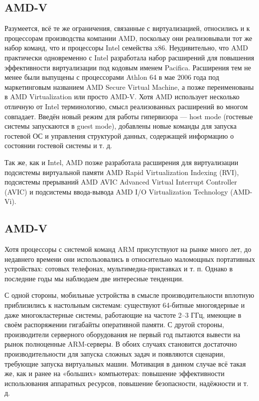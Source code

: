 \documentclass[14pt, a4paper]{article}
\begin{document}
\subsection*{\textbf{AMD-V}}

Разумеется, всё те же ограничения, связанные с виртуализацией, относились и к процессорам
производства компании AMD, поскольку они реализовывали тот же набор команд, что и процессоры
Intel семейства x86. Неудивительно, что AMD практически одновременно с Intel разработала набор
расширений для повышения эффективности виртуализации под кодовым именем Pacifica.
Расширения тем не менее были выпущены с процессорами Athlon 64 в мае 2006 года под
маркетинговым названием AMD Secure Virtual Machine, а позже переименованы в AMD Virtualization
или просто AMD-V. Хотя AMD использует несколько отличную от Intel терминологию, смысл
реализованных расширений во многом совпадает. Введён новый режим для работы гипервизора —
host mode (гостевые системы запускаются в guest mode), добавлены новые команды для запуска
гостевой ОС и управления структурой данных, содержащей информацию о состоянии гостевой
системы и т. д.

Так же, как и Intel, AMD позже разработала расширения для виртуализации подсистемы виртуальной
памяти AMD Rapid Virtualization Indexing (RVI), подсистемы прерываний AMD AVIC Advanced Virtual
Interrupt Controller (AVIC) и подсистемы ввода-вывода AMD I/O Virtualization Technology (AMD-Vi).

\subsection*{\textbf{AMD-V}}

Хотя процессоры с системой команд ARM присутствуют на рынке много лет, до недавнего времени
они использовались в относительно маломощных портативных устройствах: сотовых телефонах,
мультимедиа-приставках и т. п. Однако в последние годы мы наблюдаем две интересные тенденции.

С одной стороны, мобильные устройства в смысле производительности вплотную приблизились к
настольным системам: существуют 64-битные многоядерные и даже многокластерные системы,
работающие на частоте 2–3 ГГц, имеющие в своём распоряжении гигабайты оперативной памяти. С
другой стороны, производители серверного оборудования не первый год пытаются вывести на рынок
полноценные ARM-серверы. В обоих случаях становится достаточно производительности для запуска
сложных задач и появляются сценарии, требующие запуска виртуальных машин. Мотивация в данном
случае всё такая же, как и ранее на «больших» компьютерах: повышение эффективности
использования аппаратных ресурсов, повышение безопасности, надёжности и т. д.
\end{document}
